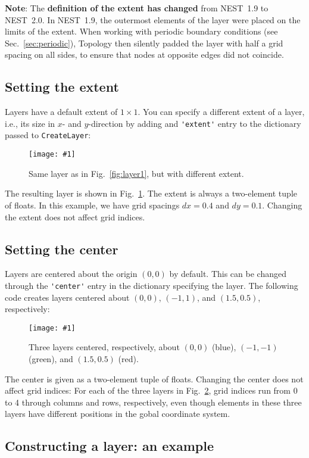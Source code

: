 \documentclass[a4paper,12pt]{report}
\newcommand{\scriptfig}[4]{%
\begin{figure}
\centerline{\texttt{[image: \#1]}}
\caption[#3]{#4}
\label{fig:#1}
\end{figure}%
}
\begin{document}
\textbf{Note}: The \textbf{definition of the extent has changed} from
NEST~1.9 to NEST~2.0. In NEST~1.9, the outermost elements of the layer
were placed on the limits of the extent. When working with periodic
boundary conditions (see Sec.~\ref{sec:periodic}), Topology then
silently padded the layer with half a grid spacing on all sides, to
ensure that nodes at opposite edges did not coincide.

\subsection{Setting the extent}\label{sec:setextent}

Layers have a default extent of $1\times 1$. 
You can specify a different extent of a layer, i.e., its size in $x$- and
$y$-direction by adding and \lstinline!'extent'! entry to the
dictionary passed to \lstinline!CreateLayer!:
%

\scriptfig{layer2}{0.8}{Layer with non-standard extent}%
{Same layer as in Fig.~\ref{fig:layer1}, but with different extent.}
%
The resulting layer is shown in Fig.~\ref{fig:layer2}. The extent is
always a two-element tuple of floats. In this example, we have grid
spacings $dx=0.4$ and $dy=0.1$. Changing the extent does not affect
grid indices.

\subsection{Setting the center}\label{sec:setcenter}

Layers are centered about the origin $(0,0)$ by default. This can be
changed through the \lstinline!'center'! entry in the dictionary
specifying the layer. The following code creates layers centered about
$(0,0)$, $(-1,1)$, and $(1.5,0.5)$, respectively:
%

\scriptfig{layer3}{0.8}{Layers with different centers}%
{Three layers centered, respectively, about $(0,0)$ (blue), $(-1,-1)$
  (green), and $(1.5,0.5)$ (red).}
%
The center is given as a two-element tuple of floats.
Changing the center does not affect grid indices: For each of the
three layers in Fig.~\ref{fig:layer3}, grid indices run from 0 to 4
through columns and rows, respectively, even though elements in these
three layers have different positions in the gobal coordinate system.

\subsection{Constructing a layer: an example}\label{sec:fixedlayerexample}
\end{document}

